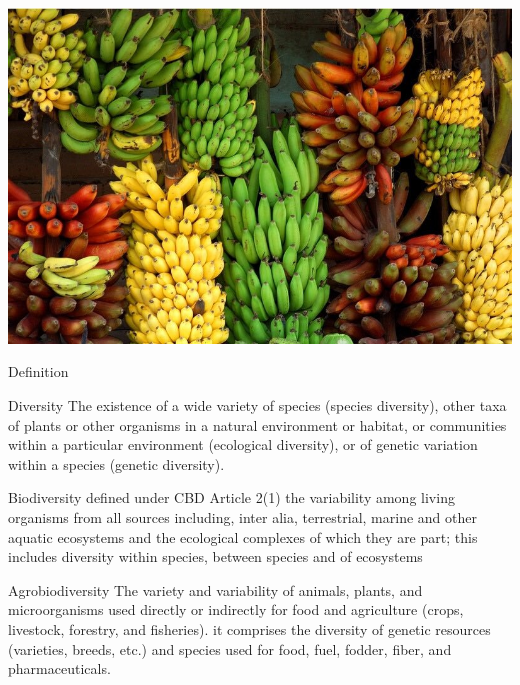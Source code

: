 \documentclass[
  ignorenonframetext,
  aspectratio=169]{beamer}
\begin{document}
\begin{frame}{}
\protect\hypertarget{section-7}{}
\begin{center}\includegraphics[width=0.6\linewidth]{../images/banana_diversity_D7N0aiTWsAAFrCs} \end{center}
\end{frame}

\begin{frame}{Definition}
\protect\hypertarget{definition}{}
\begin{block}{Diversity}
The existence of a wide variety of species (species diversity), other taxa of plants or other organisms in a natural environment or habitat, or communities within a particular environment (ecological diversity), or of genetic variation within a species (genetic diversity).
\end{block}
\end{frame}

\begin{frame}{}
\protect\hypertarget{section-8}{}
\begin{block}{Biodiversity defined under CBD Article 2(1)}
the variability among living organisms from all sources including, inter alia, terrestrial, marine and other aquatic ecosystems and the ecological complexes of which they are part; this includes diversity within species, between species and of ecosystems
\end{block}

\begin{block}{Agrobiodiversity}
The variety and variability of animals, plants, and microorganisms used directly or indirectly for food and agriculture (crops, livestock, forestry, and fisheries). it comprises the diversity of genetic resources (varieties, breeds, etc.) and species used for food, fuel, fodder, fiber, and pharmaceuticals.
\end{block}
\end{frame}
\end{document}
